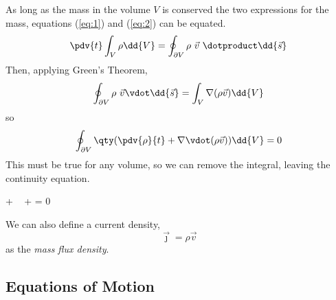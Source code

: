   As long as the mass in the volume $V$ is conserved the two expressions
  for the mass, equations (\ref{eq:1}) and (\ref{eq:2}) can be equated.
  \begin{equation}
    \label{eq:3}
    \pdv{t} \int_V \rho \dd{V} = \oint_{\partial V} \rho \ \vec{v}\ \dotproduct \dd{\vec{s}}
  \end{equation}
  Then, applying Green's Theorem,
  \begin{equation*}
    \label{eq:4}
    \oint_{\partial V} \rho \ \vec{v} \vdot \dd{\vec{s}} = \int_V \nabla(\rho \vec{v}) \dd{V}
  \end{equation*}
  so
  \begin{equation}
    \label{eq:5}
    \oint_{\partial V} \qty( \pdv{\rho}{t} + \nabla \vdot (\rho \vec{v}) ) \dd{V} = 0
  \end{equation}
  This must be true for any volume, so we can remove the integral,
  leaving the continuity equation.

\begin{fequation}
\label{eq:continuity}
\newcommand{\EQcontinuity}{
   \pdv{\rho}{t} + \rho \ \nabla \vdot \vec{v} +  \vdot \nabla \rho = 0
}
   \EQcontinuity
\end{fequation}






We can also define a current density,
\begin{equation}
  \label{eq:6}
  \vec{\jmath} = \rho \vec{v}
\end{equation}
as the \emph{mass flux density}.

\subsection{Equations of Motion}
\label{sec:equations-motion}

